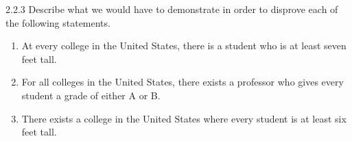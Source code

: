 
\begin{exercise}
    {2.2.3} Describe what we would have to demonstrate in order to disprove each of the following statements.
    \begin{enumerate}
        \item At every college in the United States, there is a student who is at least
              seven feet tall.
        \item For all colleges in the United States, there exists a professor who gives every student a grade of either A or B.
        \item There exists a college in the United States where every student is at least six feet tall.
    \end{enumerate}
\end{exercise}

